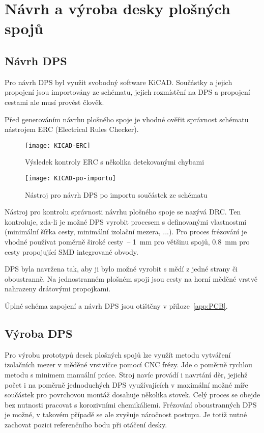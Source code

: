 \section{Návrh a výroba desky plošných spojů}
\subsection{Návrh DPS}
Pro návrh DPS byl využit svobodný software KiCAD. Součástky a jejich propojení
jsou importovány ze schématu, jejich rozmístění na DPS a propojení cestami ale
musí provést člověk.

Před generováním návrhu plošného spoje je vhodné ověřit správnost schématu
nástrojem ERC (Electrical Rules Checker).

\begin{figure}[htbp]
    \centering
    \texttt{[image: KICAD-ERC]}
    \caption{Výsledek kontroly ERC s několika detekovanými chybami}
    \label{fig:kicad ERC}
\end{figure}

\begin{figure}[htbp]
    \centering
    \texttt{[image: KICAD-po-importu]}
    \caption{%
        Nástroj pro návrh DPS  po importu součástek ze
        schématu
    }
    \label{fig:kicad po importu}
\end{figure}

Nástroj pro kontrolu správnosti návrhu plošného spoje se nazývá DRC. Ten
kontroluje, zda-li je možné DPS vyrobit procesem s definovanými vlastnostmi
(minimální šířka cesty, minimální izolační mezera, ...). Pro proces frézování
je vhodné používat poměrně široké cesty~-- \SI{1}{\milli\meter} pro většinu
spojů, \SI{0,8}{\milli\meter} pro cesty propojující SMD integrované obvody.

DPS byla navržena tak, aby ji bylo možné vyrobit s mědí z jedné strany či
oboustranně. Na jednostranném plošném spoji jsou cesty na horní měděné vrstvě
nahrazeny drátovými propojkami.

Úplné schéma zapojení a návrh DPS jsou otištěny v příloze~\ref{app:PCB}.


\subsection{Výroba DPS}
Pro výrobu prototypů desek plošných spojů lze využít metodu vytváření
izolačních mezer v měděné vrstvičce pomocí CNC frézy. Jde o poměrně rychlou
metodu s minimem manuální práce. Stroj navíc provádí i navrtání děr, jejichž
počet i na poměrně jednoduchých DPS využívajících v maximální možné míře
součástek pro povrchovou montáž dosahuje několika stovek. Celý proces se obejde
bez nutnosti pracovat s korozivními chemikáliemi. Frézování oboustranných DPS
je možné, v takovém případě se ale zvyšuje náročnost postupu. Je totiž nutné
zachovat pozici referenčního bodu při otáčení desky.

